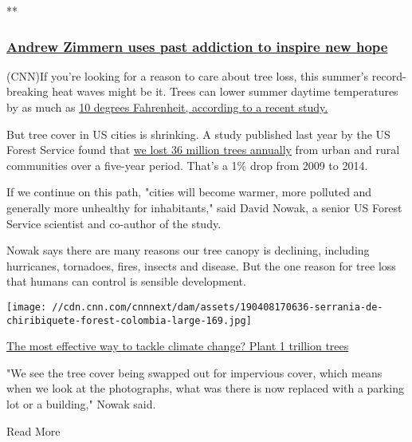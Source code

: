 **

\hypertarget{andrew-zimmern-uses-past-addiction-to-inspire-new-hope}{%
\subsubsection{\texorpdfstring{\href{/videos/tv/2017/05/26/iyw-andrew-zimmern-services-for-the-underserved.cnn/video/playlists/impact-your-world/}{Andrew
Zimmern uses past addiction to inspire new
hope}}{Andrew Zimmern uses past addiction to inspire new hope}}\label{andrew-zimmern-uses-past-addiction-to-inspire-new-hope}}

(CNN)If you're looking for a reason to care about tree loss, this
summer's record-breaking heat waves might be it. Trees can lower summer
daytime temperatures by as much as
\href{https://www.sciencedaily.com/releases/2019/03/190325173305.htm}{10
degrees Fahrenheit, according to a recent
study}\href{https://www.fs.fed.us/nrs/pubs/jrnl/2018/nrs_2018_nowak_005.pdf}{.}

But tree cover in US cities is shrinking. A study published last year by
the US Forest Service found that
\href{https://www.fs.fed.us/nrs/pubs/jrnl/2018/nrs_2018_nowak_005.pdf}{we
lost 36 million trees annually} from urban and rural communities over a
five-year period. That's a 1\% drop from 2009 to 2014.

If we continue on this path, "cities will become warmer, more polluted
and generally more unhealthy for inhabitants," said David Nowak, a
senior US Forest Service scientist and co-author of the study.

Nowak says there are many reasons our tree canopy is declining,
including hurricanes, tornadoes, fires, insects and disease. But the one
reason for tree loss that humans can control is sensible development.

\href{/2019/04/17/world/trillion-trees-climate-change-intl-scn/index.html}{}

\texttt{[image: //cdn.cnn.com/cnnnext/dam/assets/190408170636-serrania-de-chiribiquete-forest-colombia-large-169.jpg]}

\href{/2019/04/17/world/trillion-trees-climate-change-intl-scn/index.html}{The
most effective way to tackle climate change? Plant 1 trillion trees}

"We see the tree cover being swapped out for impervious cover, which
means when we look at the photographs, what was there is now replaced
with a parking lot or a building," Nowak said.

Read More

